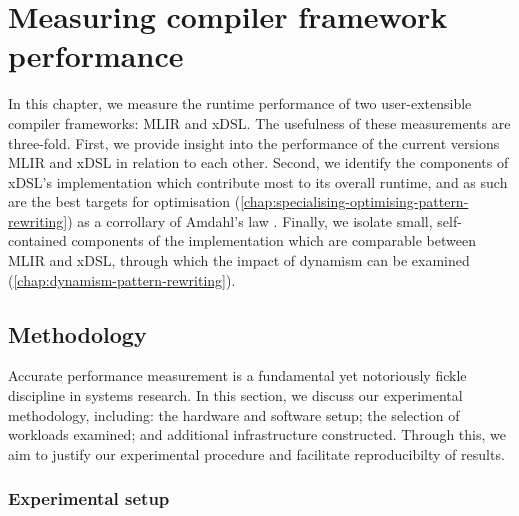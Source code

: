 \chapter{Measuring compiler framework performance}
\label{chap:measuring-compiler-performance}

In this chapter, we measure the runtime performance of two user-extensible compiler frameworks: MLIR and xDSL.
The usefulness of these measurements are three-fold. First, we provide insight into the performance of the current versions MLIR and xDSL in relation to each other. %
Second, we identify the components of xDSL's implementation which contribute most to its overall runtime, and as such are the best targets for optimisation (\autoref{chap:specialising-optimising-pattern-rewriting}) as a corrollary of Amdahl's law \cite{amdahlValiditySingleProcessor1967}.
Finally, we isolate small, self-contained components of the implementation which are comparable between MLIR and xDSL, through which the impact of dynamism can be examined (\autoref{chap:dynamism-pattern-rewriting}).



\section{Methodology}
\label{sec:methodology}

Accurate performance measurement is a fundamental yet notoriously fickle discipline in systems research.
In this section, we discuss our experimental methodology, including: the hardware and software setup; the selection of workloads examined; and additional infrastructure constructed.
Through this, we aim to justify our experimental procedure and facilitate reproducibilty of results.

\subsection{Experimental setup}
\label{ssec:experimental-setup}

